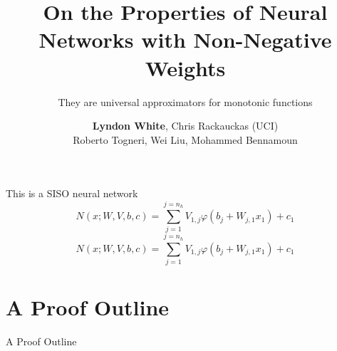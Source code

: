 \documentclass[dvipsnames]{beamer}
\author{\textbf{Lyndon White}, Chris Rackauckas (UCI)\\ Roberto Togneri, Wei Liu, Mohammed Bennamoun}
\title{On the Properties of Neural Networks with Non-Negative Weights}
\subtitle{They are universal approximators for monotonic functions}
\begin{document}
\frame{\maketitle}


\begin{frame}{This is a SISO neural network}
	\begin{equation*}
	N(x;W,V,b,c) = \sum_{j=1}^{j=n_h} V_{1,j} \varphi (b_j+W_{j,1}x_1) + c_1
	\end{equation*}
	\pause
	\begin{equation*}
	N(x;W,V,b,c) = \sum_{j=1}^{j=n_h} V_{1,j} \varphi (b_j+W_{j,1}x_1) + c_1
	\end{equation*}
\end{frame}

\section{A Proof Outline}
\begin{frame}{A Proof Outline}
	
\end{frame}
\end{document}
